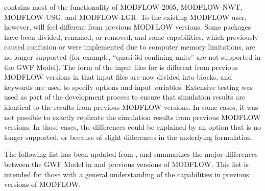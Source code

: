 \mf contains most of the functionality of MODFLOW-2005, MODFLOW-NWT, MODFLOW-USG, and MODFLOW-LGR.  To the existing MODFLOW user, however, \mf will feel different from previous MODFLOW versions.  Some packages have been divided, renamed, or removed, and some capabilities, which previously caused confusion or were implemented due to computer memory limitations, are no longer supported (for example, ``quasi-3d confining units'' are not supported in the GWF Model).  The form of the input files for \mf is different from previous MODFLOW versions in that input files are now divided into blocks, and keywords are used to specify options and input variables.  Extensive testing was used as part of the development process to ensure that \mf simulation results are identical to the results from previous MODFLOW versions.  In some cases, it was not possible to exactly replicate the simulation results from previous MODFLOW versions.  In those cases, the differences could be explained by an option that is no longer supported, or because of slight differences in the underlying formulation.  

The following list has been updated from \cite{modflow6gwf}, and summarizes the major differences between the GWF Model in \mf and previous versions of MODFLOW.  This list is intended for those with a general understanding of the capabilities in previous versions of MODFLOW.

